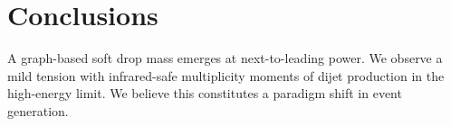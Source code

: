 \section{Conclusions}\label{sec:conclusions}

A graph-based soft drop mass emerges at next-to-leading power. We
observe a mild tension with infrared-safe multiplicity moments of dijet
production in the high-energy limit. We believe this constitutes a
paradigm shift in event generation.

